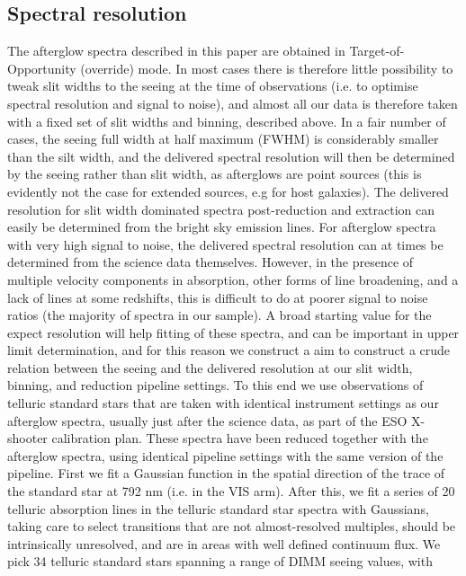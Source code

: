 \documentclass[iop, twocolappendix, numberedappendix, tighten, appendixfloats]{emulateapj}
\begin{document}
	\subsection{Spectral resolution}
	The afterglow spectra described in this paper are obtained in
	Target-of-Opportunity (override) mode.
	In most cases there is therefore little possibility to tweak slit widths to the
	seeing at the time of observations (i.e. to optimise spectral resolution and
	signal to noise), and almost all our data is therefore taken with a fixed set
	of slit widths and binning, described above.
	In a fair number of cases, the seeing full width at half maximum (FWHM) is
	considerably smaller than the silt width, and the delivered spectral resolution
	will then be determined by the seeing rather than slit width, as afterglows are
	point sources (this is evidently not the case for extended sources, e.g for
	host galaxies).
	The delivered resolution for slit width dominated spectra post-reduction and
	extraction can easily be determined from the bright sky emission lines.
	For afterglow spectra with very high signal to noise, the delivered spectral
	resolution can at times be determined from the science data themselves.
	However, in the presence of multiple velocity components in absorption, other
	forms of line broadening, and a lack of lines at some redshifts, this is
	difficult to do at poorer signal to noise ratios (the majority of spectra in
	our sample).
	A broad starting value for the expect resolution will help fitting of these
	spectra, and can be important in upper limit determination, and for this reason
	we construct a aim to construct a crude relation between the seeing and the
	delivered resolution at our slit width, binning, and reduction pipeline
	settings.
	To this end we use observations of telluric standard stars that are taken with
	identical instrument settings as our afterglow spectra, usually just after the
	science data, as part of the ESO X-shooter calibration plan.
	These spectra have been reduced together with the afterglow spectra, using
	identical pipeline settings with the same version of the pipeline.
	First we fit a Gaussian function in the spatial direction of the trace of the
	standard star at 792 nm (i.e. in the VIS arm).
	After this, we fit a series of  20 telluric absorption lines in the telluric
	standard star spectra with Gaussians, taking care to select transitions that
	are not almost-resolved multiples, should be intrinsically unresolved, and are
	in areas with well defined continuum flux.
	We pick 34 telluric standard stars spanning a range of DIMM seeing values, with
\end{document}
